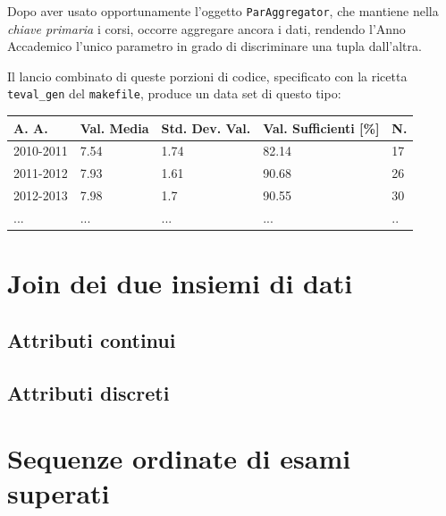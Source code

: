 		

		\vspace{0.3cm}

		Dopo aver usato opportunamente l'oggetto \texttt{ParAggregator}, che mantiene nella \textit{chiave primaria} i corsi, occorre aggregare ancora i dati, rendendo l'Anno Accademico l'unico parametro in grado di discriminare una tupla dall'altra.

		

		\vspace{0.3cm}

		Il lancio combinato di queste porzioni di codice, specificato con la ricetta \texttt{teval\_gen} del \texttt{makefile}, produce un data set di questo tipo:\\

		\begin{tabular}{lllll}
		\hline
		A. A. & Val. Media & Std. Dev. Val. & Val. Sufficienti {[}\%{]} & N. \\ \hline
		2010-2011 & 7.54 & 1.74 & 82.14 & 17 \\
		2011-2012 & 7.93 & 1.61 & 90.68 & 26 \\
		2012-2013 & 7.98 & 1.7 & 90.55 & 30 \\
		... & ... & ... & ... & .. \\ \hline
		\end{tabular}

		\vspace{0.3cm}

\section{Join dei due insiemi di dati}

	\subsection{Attributi continui}

	\subsection{Attributi discreti}

\section{Sequenze ordinate di esami superati}

